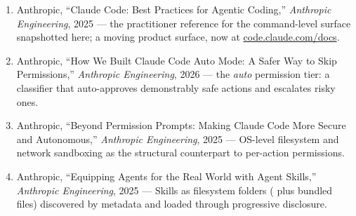 \begin{small}
\begin{enumerate}
\item Anthropic, ``Claude Code: Best Practices for Agentic Coding,'' \emph{Anthropic Engineering}, 2025 --- the practitioner reference for the command-level surface snapshotted here; a moving product surface, now at \href{https://code.claude.com/docs}{code.claude.com/docs}.
\item Anthropic, ``How We Built Claude Code Auto Mode: A Safer Way to Skip Permissions,'' \emph{Anthropic Engineering}, 2026 --- the \emph{auto} permission tier: a classifier that auto-approves demonstrably safe actions and escalates risky ones.
\item Anthropic, ``Beyond Permission Prompts: Making Claude Code More Secure and Autonomous,'' \emph{Anthropic Engineering}, 2025 --- OS-level filesystem and network sandboxing as the structural counterpart to per-action permissions.
\item Anthropic, ``Equipping Agents for the Real World with Agent Skills,'' \emph{Anthropic Engineering}, 2025 --- Skills as filesystem folders ( plus bundled files) discovered by metadata and loaded through progressive disclosure.
\end{enumerate}
\end{small}

